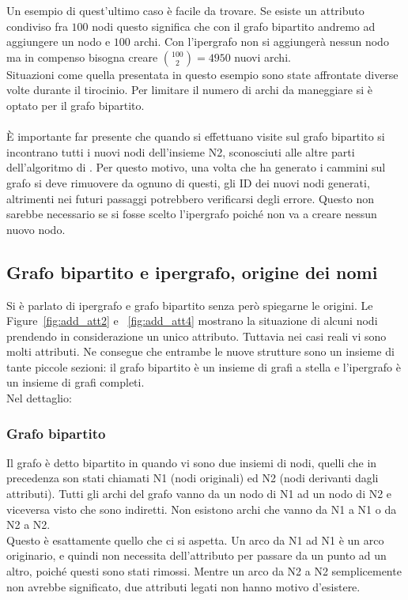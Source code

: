 Un esempio di quest'ultimo caso è facile da trovare. Se esiste un attributo condiviso fra $100$ nodi questo significa che con il grafo bipartito andremo ad aggiungere un nodo e $100$ archi. Con l'ipergrafo non si aggiungerà nessun nodo ma in compenso bisogna creare $ \binom{100}{2} = 4950$ nuovi archi.\\
Situazioni come quella presentata in questo esempio sono state affrontate diverse volte durante il tirocinio. Per limitare il numero di archi da maneggiare si è optato per il grafo bipartito.\\
\\
È importante far presente che quando si effettuano visite sul grafo bipartito si incontrano tutti i nuovi nodi dell'insieme N2, sconosciuti alle altre parti dell'algoritmo di \cnrl. Per questo motivo, una volta che \nv ha generato i cammini sul grafo si deve rimuovere da ognuno di questi, gli ID dei nuovi nodi generati, altrimenti nei futuri passaggi potrebbero verificarsi degli errore. Questo non sarebbe necessario se si fosse scelto l'ipergrafo poiché non va a creare nessun nuovo nodo.
%
\subsection{Grafo bipartito e ipergrafo, origine dei nomi}
Si è parlato di ipergrafo e grafo bipartito senza però spiegarne le origini. Le Figure~\ref{fig:add_att2} e ~\ref{fig:add_att4} mostrano la situazione di alcuni nodi prendendo in considerazione un unico attributo. Tuttavia nei casi reali vi sono molti attributi. Ne consegue che entrambe le nuove strutture sono un insieme di tante piccole sezioni: il grafo bipartito è un insieme di grafi a stella e l'ipergrafo è un insieme di grafi completi.\\
Nel dettaglio:
%
\subsubsection*{Grafo bipartito}
Il grafo è detto bipartito in quando vi sono due insiemi di nodi, quelli che in precedenza son stati chiamati N1 (nodi originali) ed N2 (nodi derivanti dagli attributi). Tutti gli archi del grafo vanno da un nodo di N1 ad un nodo di N2 e viceversa visto che sono indiretti. Non esistono archi che vanno da N1 a N1 o da N2 a N2.\\
Questo è esattamente quello che ci si aspetta. Un arco da N1 ad N1 è un arco originario, e quindi non necessita dell'attributo per passare da un punto ad un altro, poiché questi sono stati rimossi. Mentre un arco da N2 a N2 semplicemente non avrebbe significato, due attributi legati non hanno motivo d'esistere.
%

